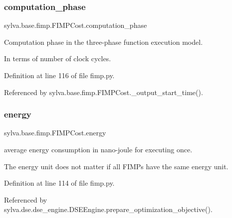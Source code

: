 \subsubsection{\texorpdfstring{computation\+\_\+phase}{computation\_phase}}
{\footnotesize\ttfamily sylva.\+base.\+fimp.\+F\+I\+M\+P\+Cost.\+computation\+\_\+phase}



Computation phase in the three-\/phase function execution model. 

In terms of number of clock cycles. 

Definition at line 116 of file fimp.\+py.



Referenced by sylva.\+base.\+fimp.\+F\+I\+M\+P\+Cost.\+\_\+output\+\_\+start\+\_\+time().

\mbox{\label{classsylva_1_1base_1_1fimp_1_1_f_i_m_p_cost_a7e0fcf06204dd67fb26243550fa22c68}} 
\subsubsection{\texorpdfstring{energy}{energy}}
{\footnotesize\ttfamily sylva.\+base.\+fimp.\+F\+I\+M\+P\+Cost.\+energy}



average energy consumption in nano-\/joule for executing once. 

The energy unit does not matter if all F\+I\+M\+Ps have the same energy unit. 

Definition at line 114 of file fimp.\+py.



Referenced by sylva.\+dse.\+dse\+\_\+engine.\+D\+S\+E\+Engine.\+prepare\+\_\+optimization\+\_\+objective().

\mbox{\label{classsylva_1_1base_1_1fimp_1_1_f_i_m_p_cost_a6b12a5e2573490c298eb49479e5c5db3}} 
